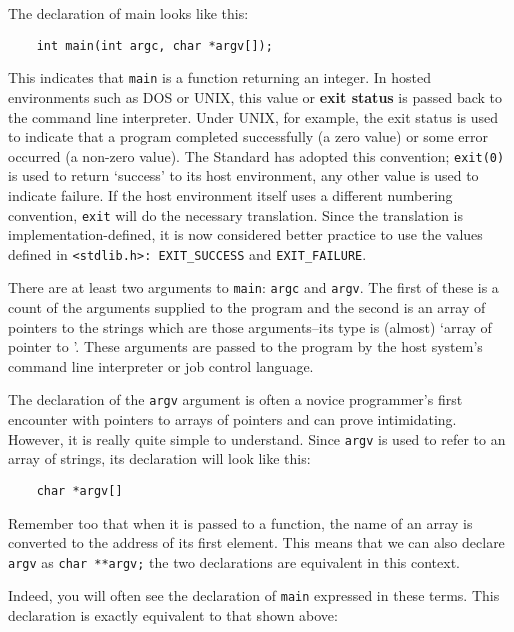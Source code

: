  The declaration of main looks like this:


  \begin{Verbatim}
    int main(int argc, char *argv[]);
  \end{Verbatim}

  This indicates that \texttt{main} is a function returning an
   integer. In hosted environments such as DOS or UNIX, this value or
   \textbf{exit status} is passed back to the command line interpreter. Under
   UNIX, for example, the exit status is used to indicate that a program
   completed successfully (a zero value) or some error occurred (a non-zero
   value). The Standard has adopted this convention; \texttt{exit(0)} is
   used to return `success' to its host environment, any other value is
   used to indicate failure. If the host environment itself uses a different
   numbering convention, \texttt{exit} will do the necessary
   translation. Since the translation is implementation-defined, it is now
   considered better practice to use the values defined in
   \texttt{<stdlib.h>: EXIT\_SUCCESS} and
   \texttt{EXIT\_FAILURE}.


  There are at least two arguments to \texttt{main}:
   \texttt{argc} and \texttt{argv}.  The first of these is a count
   of the arguments supplied to the program and the second is an array of
   pointers to the strings which are those arguments--its type is
   (almost) `array of pointer to \kchar'. These arguments
   are passed to the program by the host system's command line interpreter
   or job control language.


  The declaration of the \texttt{argv} argument is often a novice
   programmer's first encounter with pointers to arrays of pointers and can
   prove intimidating. However, it is really quite simple to understand.
   Since \texttt{argv} is used to refer to an array of strings, its
   declaration will look like this:


  \begin{Verbatim}
    char *argv[]
  \end{Verbatim}

  Remember too that when it is passed to a function, the name of an array
   is converted to the address of its first element. This means that we can
   also declare \texttt{argv} as \texttt{char **argv;} the two
   declarations are equivalent in this context.


  Indeed, you will often see the declaration of \texttt{main}
   expressed in these terms. This declaration is exactly equivalent to that
   shown above:


